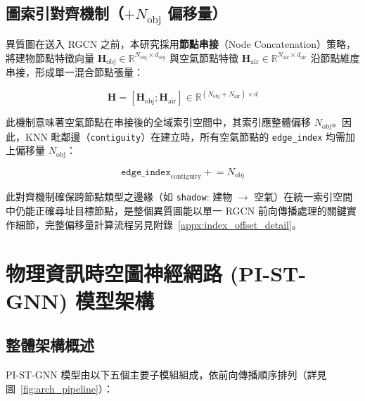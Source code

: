 \subsection{圖索引對齊機制（$+N_{\text{obj}}$ 偏移量）}
\label{subsec:index_offset}

異質圖在送入 RGCN 之前，本研究採用\textbf{節點串接}（Node Concatenation）策略，將建物節點特徵向量 $\mathbf{H}_{\text{obj}} \in \mathbb{R}^{N_{\text{obj}} \times d_{\text{obj}}}$ 與空氣節點特徵 $\mathbf{H}_{\text{air}} \in \mathbb{R}^{N_{\text{air}} \times d_{\text{air}}}$ 沿節點維度串接，形成單一混合節點張量：

\begin{equation}
    \mathbf{H} = \left[ \mathbf{H}_{\text{obj}} ; \mathbf{H}_{\text{air}} \right] \in \mathbb{R}^{(N_{\text{obj}} + N_{\text{air}}) \times d}
    \label{eq:node_concat}
\end{equation}

此機制意味著空氣節點在串接後的全域索引空間中，其索引應整體偏移 $N_{\text{obj}}$。因此，KNN 毗鄰邊（\texttt{contiguity}）在建立時，所有空氣節點的 \texttt{edge\_index} 均需加上偏移量 $N_{\text{obj}}$：

\begin{equation}
    \texttt{edge\_index}_{\text{contiguity}} \mathrel{+}= N_{\text{obj}}
    \label{eq:offset}
\end{equation}

此對齊機制確保跨節點類型之邊緣（如 \texttt{shadow}: 建物 $\to$ 空氣）在統一索引空間中仍能正確尋址目標節點，是整個異質圖能以單一 RGCN 前向傳播處理的關鍵實作細節，完整偏移量計算流程另見附錄~\ref{appx:index_offset_detail}。


\section{物理資訊時空圖神經網路 (PI-ST-GNN) 模型架構}
\label{sec:gnn_model}

\subsection{整體架構概述}
\label{subsec:model_overview}

PI-ST-GNN 模型由以下五個主要子模組組成，依前向傳播順序排列（詳見圖~\ref{fig:arch_pipeline}）：

